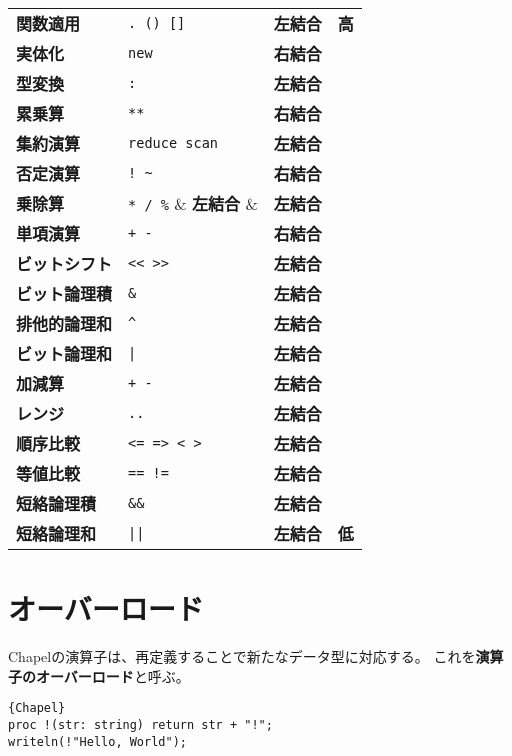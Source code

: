 \documentclass[10pt,a4paper]{book}
\begin{document}
\begin{table}[h]
\raggedright
\begin{tabular}{llll}
\textbf{関数適用}     & \verb#. () []#     & \textbf{左結合} & \textbf{高} \\
\textbf{実体化}       & \verb#new#         & \textbf{右結合} & \\
\textbf{型変換}       & \verb#:#           & \textbf{左結合} & \\
\textbf{累乗算}       & \verb#**#          & \textbf{右結合} & \\
\textbf{集約演算}     & \verb#reduce scan# & \textbf{左結合} & \\
\textbf{否定演算}     & \verb#! ~#         & \textbf{右結合} & \\
\textbf{乗除算}       & \verb#* / %#       & \textbf{左結合} & \\
\textbf{単項演算}     & \verb#+ -#         & \textbf{右結合} & \\
\textbf{ビットシフト} & \verb#<< >>#       & \textbf{左結合} & \\
\textbf{ビット論理積} & \verb#&#           & \textbf{左結合} & \\
\textbf{排他的論理和} & \verb#^#           & \textbf{左結合} & \\
\textbf{ビット論理和} & \verb#|#           & \textbf{左結合} & \\
\textbf{加減算}       & \verb#+ -#         & \textbf{左結合} & \\
\textbf{レンジ}       & \verb#..#          & \textbf{左結合} & \\
\textbf{順序比較}     & \verb#<= => < >#   & \textbf{左結合} & \\
\textbf{等値比較}     & \verb#== !=#       & \textbf{左結合} & \\
\textbf{短絡論理積}   & \verb#&&#          & \textbf{左結合} & \\
\textbf{短絡論理和}   & \verb#||#          & \textbf{左結合} & \textbf{低} \\
\end{tabular}
\end{table}

\section{オーバーロード}

Chapelの演算子は、再定義することで新たなデータ型に対応する。
これを\textbf{演算子のオーバーロード}と呼ぶ。

\begin{Verbatim}{Chapel}
proc !(str: string) return str + "!";
writeln(!"Hello, World");
\end{Verbatim}
\end{document}
